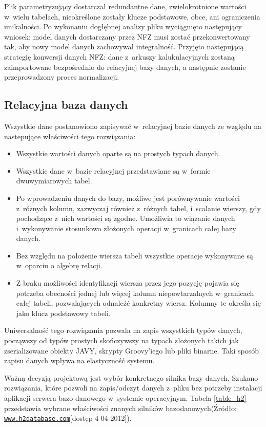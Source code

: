 Plik parametryzujący dostarczał redundantne dane, zwielokrotnione wartości w~wielu tabelach, nieokreślone zostały klucze podstawowe, obce, ani ograniczenia unikalności. Po wykonaniu dogłębnej analizy pliku wyciągnięto następujący wniosek: model danych dostarczany przez NFZ musi zostać przekonwertowany tak, aby nowy model danych zachowywał integralność. Przyjęto następującą strategię konwersji danych NFZ: dane z~arkuszy kalukulacyjnych zostaną zaimportowane bezpośrednio do relacyjnej bazy danych, a następnie zostanie przeprowadzony proces normalizacji.

\subsection{Relacyjna baza danych}
\label{sec:relacyjnaBazaDanych}

Wszystkie dane postanowiono zapisywać w~relacyjnej bazie danych ze względu na nastepujące właściwości tego rozwiązania\cite{bazy_mimuw}:
\begin{itemize}
 \item Wszystkie wartości danych oparte są na prostych typach danych.
 \item Wszystkie dane w~bazie relacyjnej przedstawiane są w~formie dwuwymiarowych tabel.
 \item Po wprowadzeniu danych do bazy, możliwe jest porównywanie wartości z~różnych kolumn, zazwyczaj również z~różnych tabel, i~scalanie wierszy, gdy pochodzące z~nich wartości są zgodne. Umożliwia to wiązanie danych i~wykonywanie stosunkowo złożonych operacji w~granicach całej bazy danych.
 \item Bez względu na położenie wiersza tabeli wszystkie operacje wykonywane są w~oparciu o algebrę relacji.
 \item Z braku możliwości identyfikacji wiersza przez jego pozycję pojawia się potrzeba obecności jednej lub więcej kolumn niepowtarzalnych w~granicach całej tabeli, pozwalających odnaleźć konkretny wiersz. Kolumny te określa się jako klucz podstawowy tabeli.
\end{itemize}
Uniwersalność tego rozwiązania pozwala na zapis wszystkich typów danych, począwszy od typów prostych skończywszy na typach złożonych takich jak zserializowane obiekty JAVY, skrypty Groovy'iego lub pliki binarne. Taki sposób zapisu danych wpływa na elastyczność systemu.

Ważną decyzją projektową jest wybór konkretnego silnika bazy danych. Szukano rozwiązania, które pozwoli na zapis/odczyt danych z~pliku bez potrzeby instalacji aplikacji serwera bazo-danowego w~systemie operacyjnym. Tabela \ref{table_h2} przedstawia wybrane właściwości znanych silników bazodanowych(Źródło: \underline{\texttt{www.h2database.com}}[dostęp 4-04-2012]).

